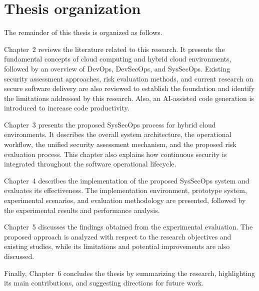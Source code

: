 \section{Thesis organization}
\label{sec:Organization}
The remainder of this thesis is organized as follows.

Chapter~2 reviews the literature related to this research. It presents the fundamental concepts of cloud computing and hybrid cloud environments, followed by an overview of DevOps, DevSecOps, and SysSecOps. Existing security assessment approaches, risk evaluation methods, and current research on secure software delivery are also reviewed to establish the foundation and identify the limitations addressed by this research. Also, an AI-assisted code generation is introduced to increase code productivity.

Chapter~3 presents the proposed SysSecOps process for hybrid cloud environments. It describes the overall system architecture, the operational workflow, the unified security assessment mechanism, and the proposed risk evaluation process. This chapter also explains how continuous security is integrated throughout the software operational lifecycle.

Chapter~4 describes the implementation of the proposed SysSecOps system and evaluates its effectiveness. The implementation environment, prototype system, experimental scenarios, and evaluation methodology are presented, followed by the experimental results and performance analysis.

Chapter~5 discusses the findings obtained from the experimental evaluation. The proposed approach is analyzed with respect to the research objectives and existing studies, while its limitations and potential improvements are also discussed.

Finally, Chapter~6 concludes the thesis by summarizing the research, highlighting its main contributions, and suggesting directions for future work.